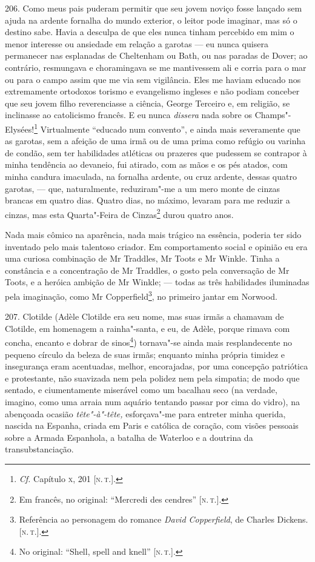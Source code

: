 206. Como meus pais puderam permitir que seu jovem noviço fosse lançado
sem ajuda na ardente fornalha do mundo exterior, o leitor pode imaginar,
mas só o destino sabe. Havia a desculpa de que eles nunca tinham
percebido em mim o menor interesse ou ansiedade em relação a garotas ---
eu nunca quisera permanecer nas esplanadas de Cheltenham ou Bath, ou nas
paradas de Dover; ao contrário, resmungava e choramingava se me
mantivessem ali e corria para o mar ou para o campo assim que me via sem
vigilância. Eles me haviam educado nos extremamente ortodoxos torismo e
evangelismo ingleses e não podiam conceber que seu jovem filho
reverenciasse a ciência, George Terceiro e, em religião, se inclinasse
ao catolicismo francês. E eu nunca \emph{dissera} nada sobre os
Champs"-Elysées!\footnote{\emph{Cf.} Capítulo \textsc{x}, 201 {[}\textsc{n.\,t.}{]}.}
Virtualmente ``educado num convento'', e ainda mais severamente que as
garotas, sem a afeição de uma irmã ou de uma prima como refúgio ou
varinha de condão, sem ter habilidades atléticas ou prazeres que
pudessem se contrapor à minha tendência ao devaneio, fui atirado, com as
mãos e os pés atados, com minha candura imaculada, na fornalha ardente,
ou cruz ardente, dessas quatro garotas, --- que, naturalmente,
reduziram"-me a um mero monte de cinzas brancas em quatro dias. Quatro
dias, no máximo, levaram para me reduzir a cinzas, mas esta Quarta"-Feira
de Cinzas\footnote{Em francês, no original: ``Mercredi des cendres''
  {[}\textsc{n.\,t.}{]}.} durou quatro anos.

Nada mais cômico na aparência, nada mais trágico na essência, poderia
ter sido inventado pelo mais talentoso criador. Em comportamento social
e opinião eu era uma curiosa combinação de Mr Traddles, Mr Toots e Mr
Winkle. Tinha a constância e a concentração de Mr Traddles, o gosto pela
conversação de Mr Toots, e a heróica ambição de Mr Winkle; --- todas as
três habilidades iluminadas pela imaginação, como Mr
Copperfield\footnote{Referência ao personagem do romance \emph{David
  Copperfield}, de Charles Dickens. {[}\textsc{n.\,t.}{]}.}, no primeiro jantar
em Norwood.

207. Clotilde (Adèle Clotilde era seu nome, mas suas irmãs a chamavam de
Clotilde, em homenagem a rainha"-santa, e eu, de Adèle, porque rimava com
concha, encanto e dobrar de sinos\footnote{No original: ``Shell, spell
  and knell'' {[}\textsc{n.\,t.}{]}.}) tornava"-se ainda mais resplandecente no
pequeno círculo da beleza de suas irmãs; enquanto minha própria timidez
e insegurança eram acentuadas, melhor, encorajadas, por uma concepção
patriótica e protestante, não suavizada nem pela polidez nem pela
simpatia; de modo que sentado, e ciumentamente miserável como um
bacalhau seco (na verdade, imagino, como uma arraia num aquário tentando
passar por cima do vidro), na abençoada ocasião \emph{tête"-à"-tête,}
esforçava"-me para entreter minha querida, nascida na Espanha, criada em
Paris e católica de coração, com visões pessoais sobre a Armada
Espanhola, a batalha de Waterloo e a doutrina da transubstanciação.

